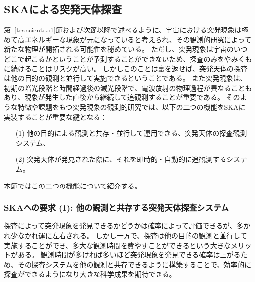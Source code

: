 \subsection{SKAによる突発天体探査}\label{transients.s2.fender}
第~\ref{transients.s1}節および次節以降で述べるように、宇宙における突発現象は極めて高エネルギーな現象が元になっていると考えられ、その観測的研究によって新たな物理が開拓される可能性を秘めている。
ただし、突発現象は宇宙のいつどこで起こるかということが予測することができないため、探査のみをやみくもに続けることはリスクが高い。
しかしこのことは裏を返せば、突発天体の探査は他の目的の観測と並行して実施できるということである。
また突発現象は、初期の増光段階と時間経過後の減光段階で、電波放射の物理過程が異なることもあり、現象が発生した直後から継続して追観測することが重要である。
そのような特徴や課題をもつ突発現象の観測的研究では、以下の二つの機能をSKAに実装することが重要な鍵となる：
\begin{itemize}
	\item[(1)] 他の目的による観測と共存・並行して運用できる、突発天体の探査観測システム、
	\item[(2)] 突発天体が発見された際に、それを即時的・自動的に追観測するシステム。
\end{itemize}
本節ではこの二つの機能について紹介する。

\subsubsection{SKAへの要求 (1): 他の観測と共存する突発天体探査システム}
探査によって突発現象を発見できるかどうかは確率によって評価できるが、多かれ少なかれ運に左右される。
しかし一方で、探査は他の目的の観測と並行して実施することができ、多大な観測時間を費やすことができるという大きなメリットがある。
観測時間が多ければ多いほど突発現象を発見できる確率は上がるため、その探査システムを他の観測と共存できるように構築することで、効率的に探査ができるようになり大きな科学成果を期待できる。

